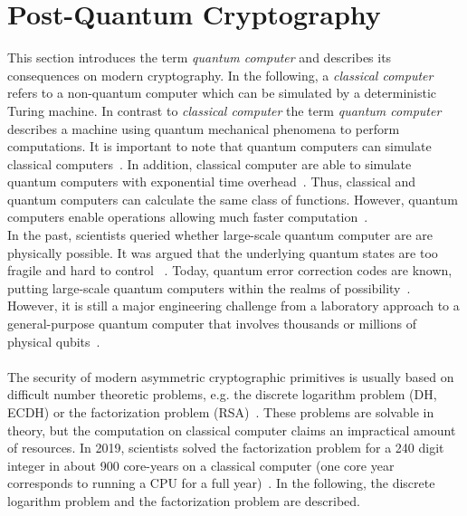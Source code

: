 \section{Post-Quantum Cryptography}
This section introduces the term \textit{quantum computer} and describes its consequences on modern cryptography. In the following, a \textit{classical computer} refers to a non-quantum computer which can be simulated by a deterministic Turing machine. In contrast to \textit{classical computer} the term \textit{quantum computer} describes a machine using quantum mechanical phenomena to perform computations. It is important to note that quantum computers can simulate classical computers~\parencite{nielsen2002quantum}. In addition, classical computer are able to simulate quantum computers with exponential time overhead~\parencite{nielsen2002quantum}. Thus, classical and quantum computers can calculate the same class of functions. However, quantum computers enable operations allowing much faster computation~\parencite{nielsen2002quantum}.\\
In the past, scientists queried whether large-scale quantum computer are are physically possible. It was argued that the underlying quantum states are too fragile and hard to control~ \parencite{chen2016report}. Today, quantum error correction codes are known, putting large-scale quantum computers within the realms of possibility~\parencite{lidar2013quantum}. However, it is still a major engineering challenge from a laboratory approach to a general-purpose quantum computer that involves thousands or millions of physical qubits~\parencite{chen2016report}.
\\\\
The security of modern asymmetric cryptographic primitives is usually based on difficult number theoretic problems, e.g. the discrete logarithm problem (\gls{DH}, \gls{ECDH}) or the factorization problem (\gls{RSA})~\parencite{chen2016report}. These problems are solvable in theory, but the computation on classical computer claims an impractical amount of resources. In 2019, scientists solved the factorization problem for a 240 digit integer in about 900 core-years on a classical computer (one core year corresponds to running a CPU for a full year)~\parencite{boudot2795}. In the following, the discrete logarithm problem and the factorization problem are described.

